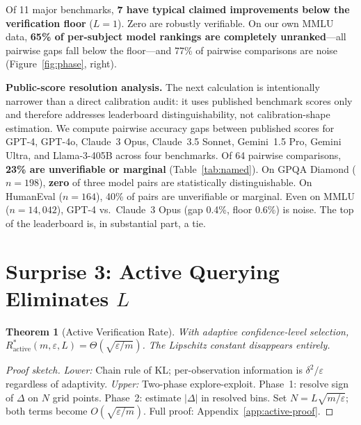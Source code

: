 \documentclass{article}
\newcommand{\Lip}{L}
\newcommand{\errrate}{\varepsilon}
\newcommand{\nsamples}{m}
\newcommand{\calmap}{\Delta}
\newcommand{\activeR}{R^*_{\mathrm{active}}}
\newcommand{\targetacc}{\delta}
\newtheorem{theorem}{Theorem}
\theoremstyle{definition}
\begin{document}

\label{tab:demolition}

Of 11 major benchmarks, \textbf{7 have typical claimed improvements below the verification floor} ($L{=}1$). Zero are robustly verifiable. On our own MMLU data, \textbf{65\% of per-subject model rankings are completely unranked}---all pairwise gaps fall below the floor---and 77\% of pairwise comparisons are noise (Figure~\ref{fig:phase}, right).

\textbf{Public-score resolution analysis.} The next calculation is intentionally narrower than a direct calibration audit: it uses published benchmark scores only and therefore addresses leaderboard distinguishability, not calibration-shape estimation. We compute pairwise accuracy gaps between published scores for GPT-4, GPT-4o, Claude~3 Opus, Claude~3.5 Sonnet, Gemini~1.5 Pro, Gemini Ultra, and Llama-3-405B across four benchmarks. Of 64 pairwise comparisons, \textbf{23\% are unverifiable or marginal} (Table~\ref{tab:named}). On GPQA Diamond ($n{=}198$), \textbf{zero} of three model pairs are statistically distinguishable. On HumanEval ($n{=}164$), 40\% of pairs are unverifiable or marginal. Even on MMLU ($n{=}14{,}042$), GPT-4 vs.\ Claude~3 Opus (gap 0.4\%, floor 0.6\%) is noise. The top of the leaderboard is, in substantial part, a tie.


\label{tab:named}

\section{Surprise 3: Active Querying Eliminates $\Lip$}
\label{sec:surprise3}

\begin{theorem}[Active Verification Rate]
\label{thm:active}
With adaptive confidence-level selection, $\activeR(\nsamples, \errrate, \Lip) = \Theta(\sqrt{\errrate/\nsamples})$. The Lipschitz constant disappears entirely.
\end{theorem}
\begin{proof}[Proof sketch]
\emph{Lower:} Chain rule of KL; per-observation information is $\targetacc^2/\errrate$ regardless of adaptivity. \emph{Upper:} Two-phase explore-exploit. Phase~1: resolve sign of $\calmap$ on $N$ grid points. Phase~2: estimate $|\calmap|$ in resolved bins. Set $N = \Lip\sqrt{\nsamples/\errrate}$; both terms become $O(\sqrt{\errrate/\nsamples})$. Full proof: Appendix~\ref{app:active-proof}.
\end{proof}
\end{document}
